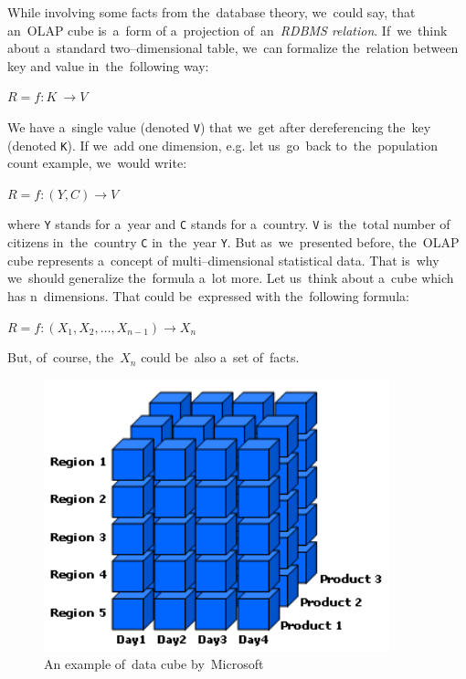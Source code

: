 While involving some facts from the~database theory, we~could say, that an~OLAP cube is~a~form
of a~projection of~an~\emph{RDBMS relation}. If~we~think about a~standard two--dimensional table, we~can
formalize the~relation between key and value in~the~following way:

\begin{center}
$R = f: K~\rightarrow V$
\end{center}

We have a~single value (denoted \texttt{V}) that we~get after dereferencing the~key (denoted \texttt{K}).
If we~add one dimension, e.g. let us~go~back to~the~population count example, we~would write:

\begin{center}
$R = f: (Y,C) \rightarrow V$
\end{center}

where \texttt{Y} stands for a~year and \texttt{C} stands for a~country. \texttt{V} is~the~total number of
citizens in~the~country \texttt{C} in~the~year \texttt{Y}.
But as~we~presented before, the~OLAP cube represents a~concept of
multi--dimensional statistical data. That is~why we~should generalize the~formula a~lot more.
Let us~think about a~cube which has n~dimensions. That could be~expressed with the~following
formula:

\begin{center}
$R = f: (X_{1}, X_{2}, …, X_{n-1}) \rightarrow X_{n}$
\end{center}

But, of~course, the~$X_{n}$ could be~also a~set of~facts.


\begin{figure}
	\centering
	\includegraphics[width=100mm]{img/data-cube.png}
	\caption{An example of~data cube by~Microsoft~\cite{msdn-cube}}
	\label{fig:lod-cloud}
\end{figure}

